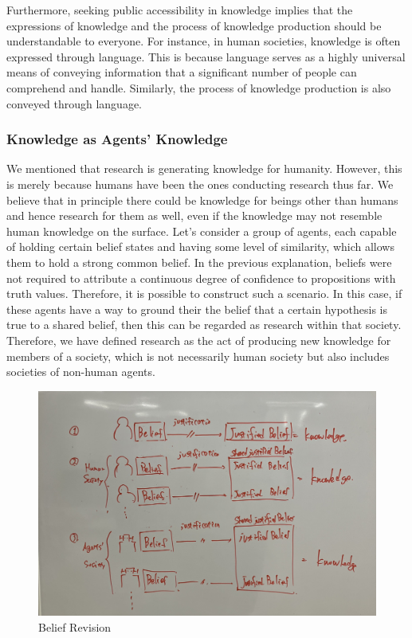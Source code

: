 \documentclass{book}
\begin{document}
Furthermore, seeking public accessibility in knowledge implies that the expressions of knowledge and the process of knowledge production should be understandable to everyone. For instance, in human societies, knowledge is often expressed through language. This is because language serves as a highly universal means of conveying information that a significant number of people can comprehend and handle. Similarly, the process of knowledge production is also conveyed through language.

\subsubsection{Knowledge as Agents' Knowledge}
We mentioned that research is generating knowledge for humanity. However, this is merely because humans have been the ones conducting research thus far. We believe that in principle there could be knowledge for beings other than humans and hence research for them as well, even if the knowledge may not resemble human knowledge on the surface. Let's consider a group of agents, each capable of holding certain belief states and having some level of similarity, which allows them to hold a strong common belief. In the previous explanation, beliefs were not required to attribute a continuous degree of confidence to propositions with truth values. Therefore, it is possible to construct such a scenario. In this case, if these agents have a way to ground their the belief that a certain hypothesis is true to a shared belief, then this can be regarded as research within that society. Therefore, we have defined research as the act of producing new knowledge for members of a society, which is not necessarily human society but also includes societies of non-human agents.

\begin{figure}[htb]
    \centering
    \includegraphics[width=\linewidth]{figs/shared_belief_revision.jpg}
    \caption{Belief Revision}
    \label{fig:definition}
\end{figure}
\end{document}
